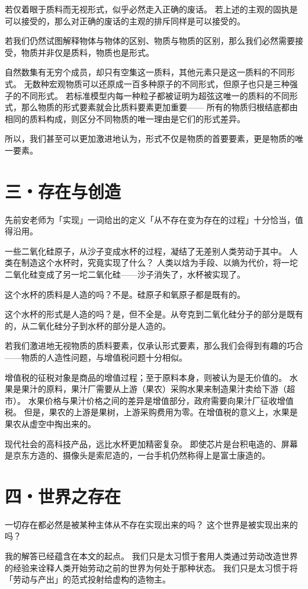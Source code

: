 若仅着眼于质料而无视形式，似乎必然走入正确的废话。
若上述的主观的固执是可以接受的，那么对正确的废话的主观的排斥同样是可以接受的。

若我们仍然试图解释物体与物体的区别、物质与物质的区别，那么我们必然需要接受，物质并非仅是质料，物质也是形式。
\clearpage

自然数集有无穷个成员，却只有空集这一质料，其他元素只是这一质料的不同形式。
无数种宏观物质可以还原成一百多种原子的不同形式，但原子也只是三种强子的不同形式。
若标准模型内每一种粒子都被证明为超弦这唯一的质料的不同形式，那么物质的形式要素就会比质料要素更加重要——
所有的物质归根结底都由相同的质料构成，则区分不同物质的唯一理由是它们的形式差异。

所以，我们甚至可以更加激进地认为，形式不仅是物质的首要要素，更是物质的唯一要素。
\clearpage







\section*{三・存在与创造}

先前安老师为「实现」一词给出的定义「从不存在变为存在的过程」十分恰当，值得沿用。

一些二氧化硅原子，从沙子变成水杯的过程，凝结了无差别人类劳动于其中。
人类在制造这个水杯时，究竟实现了什么？
人类以焓为手段、以熵为代价，将一坨二氧化硅变成了另一坨二氧化硅——沙子消失了，水杯被实现了。

这个水杯的质料是人造的吗？不是。硅原子和氧原子都是既有的。

这个水杯的形式是人造的吗？是，但不全是。从夸克到二氧化硅分子的部分是既有的，从二氧化硅分子到水杯的部分是人造的。
\clearpage

若我们激进地无视物质的质料要素，仅承认形式要素，那么我们会得到有趣的巧合——物质的人造性问题，与增值税问题十分相似。

增值税的征税对象是商品的增值过程；至于原料本身，则被认为是无价值的。
水果是果汁的原料，果汁厂需要从上游（果农）采购水果来制造果汁卖给下游（超市）。
水果价格与果汁价格之间的差异是增值部分，政府需要向果汁厂征收增值税。
但是，果农的上游是果树，上游采购费用为零。在增值税的意义上，水果是果农从虚空中掏出来的。

现代社会的高科技产品，远比水杯更加精密复杂。
即使芯片是台积电造的、屏幕是京东方造的、摄像头是索尼造的，一台手机仍然称得上是富士康造的。
\clearpage








\section*{四・世界之存在}

一切存在都必然是被某种主体从不存在实现出来的吗？
这个世界是被实现出来的吗？

我的解答已经蕴含在本文的起点。
我们只是太习惯于套用人类通过劳动改造世界的经验来诠释人类开始劳动之前的世界为何处于那种状态。
我们只是太习惯于将「劳动与产出」的范式投射给虚构的造物主。



